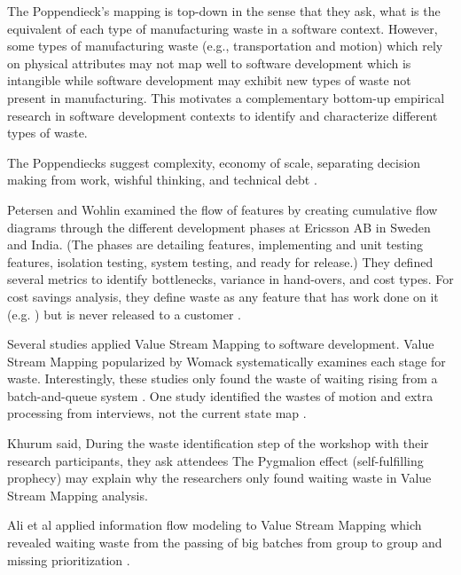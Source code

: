 The Poppendieck's mapping is top-down in the sense that they ask, what is the equivalent of each type of manufacturing waste in a software context. However, some types of manufacturing waste (e.g., transportation and motion) which rely on physical attributes may not map well to software development which is intangible while software development may exhibit new types of waste not present in manufacturing. This motivates a complementary bottom-up empirical research in software development contexts to identify and characterize different types of waste. 

The Poppendiecks suggest  complexity, economy of scale, separating decision making from work, wishful thinking, and technical debt \cite{PoppendieckResultsNotPoint}.

Petersen and Wohlin examined the flow of features by creating cumulative flow diagrams through the different development phases at Ericsson AB in Sweden and India. (The phases are detailing features, implementing and unit testing features, isolation testing, system testing, and ready for release.) They defined several metrics to identify bottlenecks, variance in hand-overs, and cost types. For cost savings analysis, they define waste as any feature that has work done on it (e.g. ) but is never released to a customer \cite{Petersen2011}.

Several studies applied Value Stream Mapping to software development. Value Stream Mapping popularized by Womack systematically examines each stage for waste. Interestingly, these studies only found the waste of waiting rising from a batch-and-queue system \cite{Ali2016, Khurum2014, Mujtaba2010}. One study identified the wastes of motion and extra processing from interviews, not the current state map \cite{Mujtaba2010}.

Khurum said,  During the waste identification step of the workshop with their research participants, they ask attendees  \cite{Khurum2014} The Pygmalion effect (self-fulfilling prophecy) may explain why the researchers only found waiting waste in Value Stream Mapping analysis.

Ali et al applied information flow modeling to Value Stream Mapping which revealed waiting waste from the passing of big batches from group to group and missing prioritization \cite{Ali2016}.

